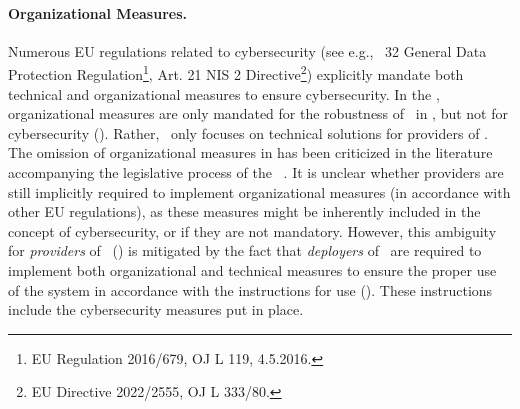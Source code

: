 \paragraph{Organizational Measures.}
Numerous EU regulations related to cybersecurity (see e.g., \Artx\ 32 General Data Protection Regulation\footnote{EU Regulation 2016/679, OJ L 119, 4.5.2016.}, Art. 21 NIS 2 Directive\footnote{EU Directive 2022/2555, OJ L 333/80.}) explicitly mandate both technical and organizational measures to ensure cybersecurity. 
In the \EUAIAct,
organizational measures are only mandated for the robustness of \HRAIS\ in , but not for cybersecurity ().
% 
Rather,  \EUAIAct\ only focuses on technical solutions for providers of \HRAIS.
% 
The omission of organizational measures in  has been criticized in the literature accompanying the legislative process of the \EUAIAct~\cite{biasin2023new}.
%
It is unclear whether providers are still implicitly required to implement organizational measures (in accordance with other EU regulations), as these measures might be inherently included in the concept of cybersecurity, or if they are not mandatory.
%
However, this ambiguity for \emph{providers} of \HRAIS\ () is mitigated by the fact that \emph{deployers} of \HRAIS\ are required to implement both organizational and technical measures to ensure the proper use of the system in accordance with the instructions for use (). These instructions include the cybersecurity measures put in place.

